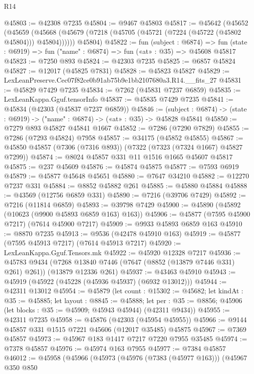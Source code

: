 \begin{lexlean}{R14}
\begin{coremodule}
@45803 := @42308 @7235
@45804 := @9467 @45803
@45817 := @45642
    (@45652
      (@45659 (@45668 (@45679 (@7218 (@45705 (@45721 (@7224 (@45722 (@45802 @45804))) @45804))))))
      @45804)
@45822 := fun (subject : @6874) =>
  fun (state : @6919) => fun ("name" : @6874) => fun («at» : @35) => @45608 @45817
@45823 := @7250 @893
@45824 := @42303 @7235
@45825 := @6857 @45824
@45827 := @12017 (@45825 @7831)
@45828 := @45823 @45827
@45829 := LexLeanPreserve.Cec07f82ce0b91ab75b9e1bb2107680a3.R14.__fits_27
@45831 := @45829 @7429 @7235
@45834 := @7262 (@45831 @7237 @6859)
@45835 := LexLeanKappa.Gguf.tensorInfo
@45837 := @45835 @7429 @7235
@45841 := @45834 (@42303 (@45837 @7237 @6859))
@45846 := (subject : @6874) -> (state : @6919) -> ("name" : @6874) -> («at» : @35) -> @45828 @45841
@45850 := @7279 @893 @45827 @45841 @1667
@45852 := @7286 (@7290 @7829)
@45855 := @7286 (@7293 @45824) @7958
@45857 := @34175 (@45852 @45855)
@45867 := @45850 @45857 (@7306 (@7316 @893)) (@7322 (@7323 (@7324 @1667) @45827 @7299))
@45874 := @8024 @45857 @331 @11 @1516 @1665 @45607 @45817
@45875 := @237 @45609
@45876 := @45874 @45875
@45877 := @7593 @6919
@45879 := @45877 @45648 @45651
@45880 := @7647 @34210
@45882 := @12270 @7237 @331
@45884 := @8852 @45882 @261
@45885 := @45880 @45884
@45888 := @43569 (@12756 @6859 @331)
@45890 := @7216 (@39706 @7429)
@45892 := @7216 (@11814 @6859)
@45893 := @39798 @7429
@45900 := @45890 (@45892 (@10623 (@9900 @45893 @6859 @163) @163))
@45906 := @45877 (@7595 @45900 @7217) (@7614 @45900 @7217)
@45909 := @9933 @45893 @6859 @163
@45910 := @8870 @7235
@45913 := @9536 (@42478 @45910 @163)
@45919 := @45877 (@7595 @45913 @7217) (@7614 @45913 @7217)
@45920 := LexLeanKappa.Gguf.Tensors.mk
@45922 := @45920 @12328 @7217
@45936 := @45783
    @9434
    (@7268 @13840 @7446 (@7647 (@8852 (@13879 @7446 @331) @261) @261))
    (@13879 @12336 @261)
@45937 := @43463 @45910
@45943 := @45919 (@45922 (@45228 (@45936 @45937) (@6932 @13012)))
@45944 := @42311 @13012
@45954 := @45879
    (let count : @15302 := @45682;
    let kindAt : @35 := @45885;
    let layout : @8845 := @45888;
    let per : @35 := @8856; @45906 (let blocks : @35 := @45909; @45943 @45944) (@42311 @9434))
@45955 := @42311 @7235
@45958 := @45876 (@42303 (@45954 @45955))
@45966 := @9144 @45857 @331 @1515 @7221 @45606 (@12017 @35485) @45875
@45967 := @7369 @45857
@45973 := @45967 @183 @1417 @7217 @7220 @7955 @35485
@45974 := @7378 @45857
@45976 := @45974 @163 @7955
@45977 := @7384 @45857
@46012 := @45958
    (@45966
      (@45973
        (@45976 (@7383 (@45977 @163)))
        (@45967
          @350
          @850

\end{coremodule}
\end{lexlean}
